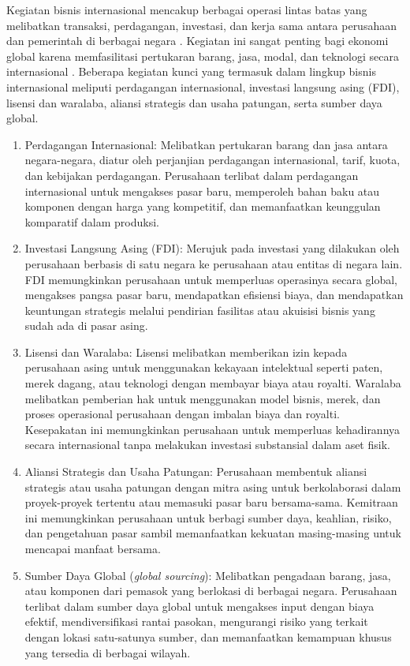 \documentclass[12pt]{article}
\begin{document}
Kegiatan bisnis internasional mencakup berbagai operasi lintas batas yang melibatkan transaksi, perdagangan, investasi, dan kerja sama antara perusahaan dan pemerintah di berbagai negara . Kegiatan ini sangat penting bagi ekonomi global karena memfasilitasi pertukaran barang, jasa, modal, dan teknologi secara internasional \autocite{bussinessToday2020}. Beberapa kegiatan kunci yang termasuk dalam lingkup bisnis internasional meliputi perdagangan internasional, investasi langsung asing (FDI), lisensi dan waralaba, aliansi strategis dan usaha patungan, serta sumber daya global.
\begin{enumerate}
    \item Perdagangan Internasional: Melibatkan pertukaran barang dan jasa antara negara-negara, diatur oleh perjanjian perdagangan internasional, tarif, kuota, dan kebijakan perdagangan. Perusahaan terlibat dalam perdagangan internasional untuk mengakses pasar baru, memperoleh bahan baku atau komponen dengan harga yang kompetitif, dan memanfaatkan keunggulan komparatif dalam produksi.
    \item Investasi Langsung Asing (FDI): Merujuk pada investasi yang dilakukan oleh perusahaan berbasis di satu negara ke perusahaan atau entitas di negara lain. FDI memungkinkan perusahaan untuk memperluas operasinya secara global, mengakses pangsa pasar baru, mendapatkan efisiensi biaya, dan mendapatkan keuntungan strategis melalui pendirian fasilitas atau akuisisi bisnis yang sudah ada di pasar asing.
    \item Lisensi dan Waralaba: Lisensi melibatkan memberikan izin kepada perusahaan asing untuk menggunakan kekayaan intelektual seperti paten, merek dagang, atau teknologi dengan membayar biaya atau royalti. Waralaba melibatkan pemberian hak untuk menggunakan model bisnis, merek, dan proses operasional perusahaan dengan imbalan biaya dan royalti. Kesepakatan ini memungkinkan perusahaan untuk memperluas kehadirannya secara internasional tanpa melakukan investasi substansial dalam aset fisik.
    \item Aliansi Strategis dan Usaha Patungan: Perusahaan membentuk aliansi strategis atau usaha patungan dengan mitra asing untuk berkolaborasi dalam proyek-proyek tertentu atau memasuki pasar baru bersama-sama. Kemitraan ini memungkinkan perusahaan untuk berbagi sumber daya, keahlian, risiko, dan pengetahuan pasar sambil memanfaatkan kekuatan masing-masing untuk mencapai manfaat bersama.
    \item Sumber Daya Global (\emph{global sourcing}): Melibatkan pengadaan barang, jasa, atau komponen dari pemasok yang berlokasi di berbagai negara. Perusahaan terlibat dalam sumber daya global untuk mengakses input dengan biaya efektif, mendiversifikasi rantai pasokan, mengurangi risiko yang terkait dengan lokasi satu-satunya sumber, dan memanfaatkan kemampuan khusus yang tersedia di berbagai wilayah.

\end{enumerate}
\end{document}
